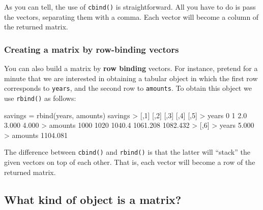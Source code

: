 \documentclass[
]{book}
\newenvironment{Shaded}{\begin{snugshade}}{\end{snugshade}}
\newcommand{\DecValTok}[1]{\textcolor[rgb]{0.00,0.00,0.81}{#1}}
\newcommand{\FloatTok}[1]{\textcolor[rgb]{0.00,0.00,0.81}{#1}}
\newcommand{\FunctionTok}[1]{\textcolor[rgb]{0.00,0.00,0.00}{#1}}
\newcommand{\NormalTok}[1]{#1}
\newcommand{\OtherTok}[1]{\textcolor[rgb]{0.56,0.35,0.01}{#1}}
\newcommand{\SpecialCharTok}[1]{\textcolor[rgb]{0.00,0.00,0.00}{#1}}
\begin{document}
As you can tell, the use of \texttt{cbind()} is straightforward. All you have to do
is pass the vectors, separating them with a comma. Each vector will become a
column of the returned matrix.

\hypertarget{creating-a-matrix-by-row-binding-vectors}{%
\subsubsection*{Creating a matrix by row-binding vectors}\label{creating-a-matrix-by-row-binding-vectors}}

You can also build a matrix by \textbf{row binding} vectors. For instance, pretend
for a minute that we are interested in obtaining a tabular object in which
the first row corresponds to \texttt{years}, and the second row to \texttt{amounts}. To
obtain this object we use \texttt{rbind()} as follows:

\begin{Shaded}
\begin{Highlighting}[]
\NormalTok{savings }\OtherTok{=} \FunctionTok{rbind}\NormalTok{(years, amounts)}
\NormalTok{savings}
\SpecialCharTok{\textgreater{}}\NormalTok{         [,}\DecValTok{1}\NormalTok{] [,}\DecValTok{2}\NormalTok{]   [,}\DecValTok{3}\NormalTok{]     [,}\DecValTok{4}\NormalTok{]     [,}\DecValTok{5}\NormalTok{]}
\SpecialCharTok{\textgreater{}}\NormalTok{ years      }\DecValTok{0}    \DecValTok{1}    \FloatTok{2.0}    \FloatTok{3.000}    \FloatTok{4.000}
\SpecialCharTok{\textgreater{}}\NormalTok{ amounts }\DecValTok{1000} \DecValTok{1020} \FloatTok{1040.4} \FloatTok{1061.208} \FloatTok{1082.432}
\SpecialCharTok{\textgreater{}}\NormalTok{             [,}\DecValTok{6}\NormalTok{]}
\SpecialCharTok{\textgreater{}}\NormalTok{ years      }\FloatTok{5.000}
\SpecialCharTok{\textgreater{}}\NormalTok{ amounts }\FloatTok{1104.081}
\end{Highlighting}
\end{Shaded}

The difference between \texttt{cbind()} and \texttt{rbind()} is that the latter will ``stack''
the given vectors on top of each other. That is, each vector will become a row
of the returned matrix.

\hypertarget{what-kind-of-object-is-a-matrix}{%
\subsection{What kind of object is a matrix?}\label{what-kind-of-object-is-a-matrix}}
\end{document}
